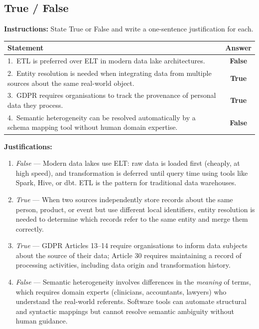 \documentclass[12pt,a4paper]{article}
\begin{document}
\subsection*{True / False}

\noindent\textbf{Instructions:} State True or False and write a one-sentence justification for each.

\begin{center}
\renewcommand{\arraystretch}{1.6}
\begin{tabular}{p{9.5cm}c}
  \toprule
  \textbf{Statement} & \textbf{Answer} \\
  \midrule
  1.\ ETL is preferred over ELT in modern data lake architectures. &
  \textbf{\textcolor{PURed}{False}} \\
  2.\ Entity resolution is needed when integrating data from multiple sources about the same real-world object. &
  \textbf{True} \\
  3.\ GDPR requires organisations to track the provenance of personal data they process. &
  \textbf{True} \\
  4.\ Semantic heterogeneity can be resolved automatically by a schema mapping tool without human domain expertise. &
  \textbf{\textcolor{PURed}{False}} \\
  \bottomrule
\end{tabular}
\end{center}

\noindent\textbf{Justifications:}
\begin{enumerate}[leftmargin=2em, nosep, after=\vspace{6pt}]
  \item \textit{False} --- Modern data lakes use ELT: raw data is loaded first (cheaply, at high speed), and transformation is deferred until query time using tools like Spark, Hive, or dbt.  ETL is the pattern for traditional data warehouses.
  \item \textit{True} --- When two sources independently store records about the same person, product, or event but use different local identifiers, entity resolution is needed to determine which records refer to the same entity and merge them correctly.
  \item \textit{True} --- GDPR Articles 13--14 require organisations to inform data subjects about the source of their data; Article 30 requires maintaining a record of processing activities, including data origin and transformation history.
  \item \textit{False} --- Semantic heterogeneity involves differences in the \textit{meaning} of terms, which requires domain experts (clinicians, accountants, lawyers) who understand the real-world referents.  Software tools can automate structural and syntactic mappings but cannot resolve semantic ambiguity without human guidance.
\end{enumerate}
\end{document}
